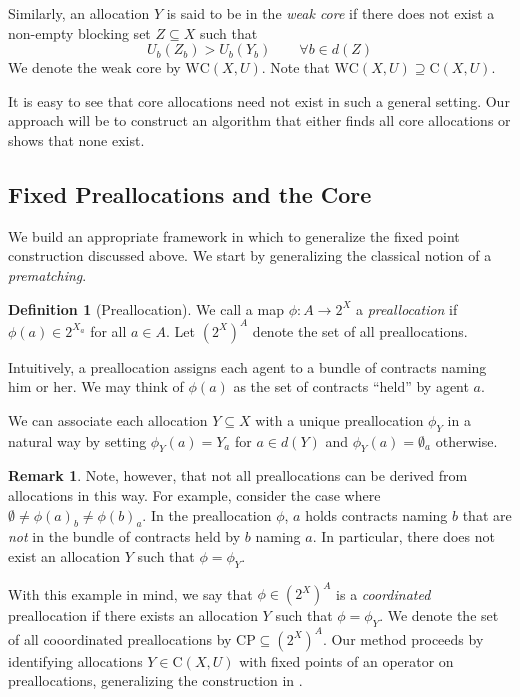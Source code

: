 \documentclass[11pt,reqno]{amsart}
\theoremstyle{definition}
\newtheorem{defn}[thm]{Definition}
\newtheorem{remark}[thm]{Remark}
\numberwithin{equation}{section}
\newcommand{\pre}{\phi}
\newcommand{\coordpre}{\mathrm{CP}}
\newcommand{\prealloc}{(2^X)^A}
\newcommand{\sub}{\subseteq}
\newcommand{\strcore}{\mathrm{C}(X,U)}
\newcommand{\core}{\mathrm{WC}(X,U)}
\begin{document}
Similarly, an allocation $Y$ is said to be in the \emph{weak core} if there does not exist a non-empty blocking set $Z \sub X$ such that 
\[
U_b(Z_b) > U_b(Y_b) \qquad  \forall b\in d(Z)
\]
We denote the weak core by $\core$. 
Note that $\core \supseteq \strcore$.

It is easy to see that core allocations need not exist in such a general setting.
Our approach will be to construct an algorithm that either finds all core allocations or shows that none exist. 

\subsection{Fixed Preallocations and the Core}
We build an appropriate framework in which to generalize the fixed point construction discussed above. 
We start by generalizing the classical notion of a \emph{prematching}. 

\begin{defn}[Preallocation] We call a map $\pre: A \to 2^X$ a \emph{preallocation} if $\pre(a) \in 2^{X_a}$ for all $a\in A$. Let $(2^X)^A$ denote the set of all preallocations.  
\end{defn}

Intuitively, a preallocation assigns each agent to a bundle of contracts naming him or her. We may think of $\pre(a)$ as the set of contracts ``held'' by agent $a$.   

We can associate each allocation $Y\subseteq X$ with a unique preallocation $\pre_Y$ in a natural way by setting $\pre_Y(a) = Y_a$ for $a \in d(Y)$ and $\pre_Y(a) = \emptyset_a$ otherwise.
\begin{remark} Note, however, that not all preallocations can be derived from allocations in this way.
For example, consider the case where $\emptyset \not = \pre(a)_b \not = \pre(b)_a$. In the preallocation $\pre$, $a$ holds contracts naming $b$ that are \emph{not} in the bundle of contracts held by $b$ naming $a$.  
In particular, there does not exist an allocation $Y$ such that $\pre = \pre_Y$. 
\end{remark}

With this example in mind, we say that $\pre \in \prealloc$ is a \emph{coordinated} preallocation if there exists an allocation $Y$ such that $\pre = \pre_Y$. 
We denote the set of all cooordinated preallocations by $\coordpre\sub \prealloc$.
Our method proceeds by identifying allocations $Y \in \strcore$ with fixed points of an operator on preallocations, generalizing the construction in \cite{EcheniqueYenmez2013}.
\end{document}
